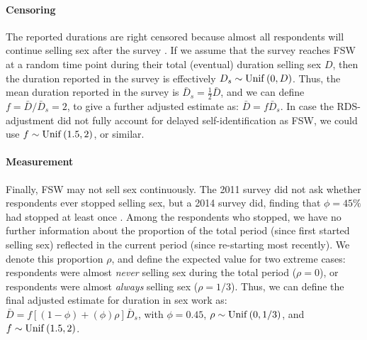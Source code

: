 \paragraph{Censoring}
The reported durations are right censored
because almost all respondents will continue selling sex after the survey \cite{Fazito2012}.
If we assume that the survey reaches FSW
at a random time point during their total (eventual) duration selling sex $D$,
then the duration reported in the survey is effectively $D_s \sim \mathrm{Unif}\,(0,D)$.
Thus, the mean duration reported in the survey is $\bar{D}_s = \frac12 \bar{D}$,
and we can define $f = \bar{D} / \bar{D}_s = 2$,
to give a further adjusted estimate as: $\bar{D} = f\bar{D}_s$.
In case the RDS-adjustment did not fully account for delayed self-identification as FSW,
we could use $f \sim \mathrm{Unif}\,(1.5,2)$, or similar.
\paragraph{Measurement}
Finally, FSW may not sell sex continuously.
The 2011 survey did not ask whether respondents ever stopped selling sex,
but a 2014 survey did, finding that $\phi = 45\%$ had stopped at least once \cite{EswKP2014}.
Among the respondents who stopped, we have no further information about
the proportion of the total period (\ie since first started selling sex)
reflected in the current period (\ie since re-starting most recently).
We denote this proportion $\rho$, and define the expected value for two extreme cases:
respondents were almost \emph{never} selling sex during the total period ($\rho = 0$), or
respondents were almost \emph{always} selling sex ($\rho = 1/3$).
Thus, we can define the final adjusted estimate for duration in sex work as:
$\bar{D} = f[(1-\phi)+(\phi)\rho]\bar{D}_s$, with
$\phi = 0.45$, $\rho \sim \mathrm{Unif}\,(0,1/3)$, and $f \sim \mathrm{Unif}\,(1.5,2)$.
